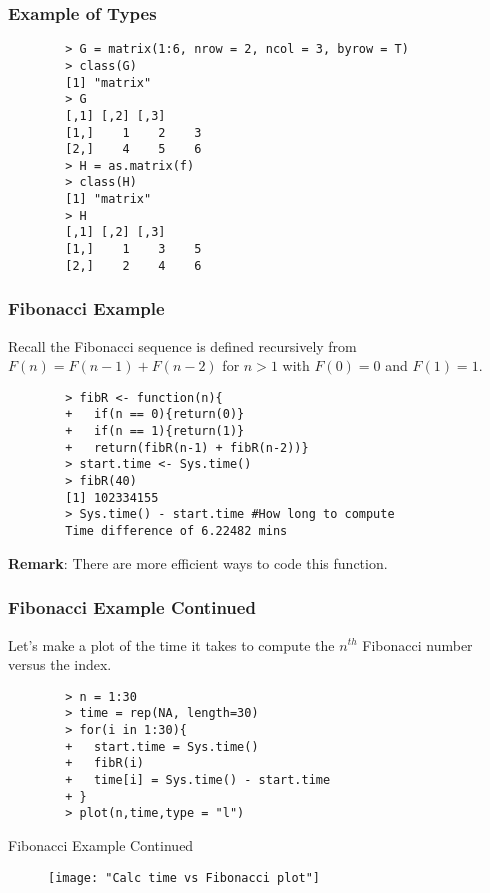 \documentclass{beamer}
\begin{document}
\begin{frame}[fragile]\frametitle{Example of Types}
	\begin{framed}
		\vspace{-0.5cm}
		\begin{verbatim}
		> G = matrix(1:6, nrow = 2, ncol = 3, byrow = T)
		> class(G)
		[1] "matrix"
		> G
		[,1] [,2] [,3]
		[1,]    1    2    3
		[2,]    4    5    6
		> H = as.matrix(f)
		> class(H)
		[1] "matrix"
		> H
		[,1] [,2] [,3]
		[1,]    1    3    5
		[2,]    2    4    6
		\end{verbatim}
	\end{framed}
\end{frame}

\begin{frame}[fragile]\frametitle{Fibonacci Example}
	Recall the Fibonacci sequence is defined recursively from $F(n)=F(n-1)+F(n-2)$ for $n>1$ with $F(0)=0$ and $F(1)=1$.
	\begin{framed}
		\begin{verbatim}
		> fibR <- function(n){
		+   if(n == 0){return(0)}
		+   if(n == 1){return(1)}
		+   return(fibR(n-1) + fibR(n-2))}
		> start.time <- Sys.time()
		> fibR(40)
		[1] 102334155
		> Sys.time() - start.time #How long to compute
		Time difference of 6.22482 mins 
		\end{verbatim}
	\end{framed}
	
	\textbf{Remark}:  There are more efficient ways to code this function. 
\end{frame}


\begin{frame}[fragile]\frametitle{Fibonacci Example Continued}
	Let's make a plot of the time it takes to compute the $n^{th}$ Fibonacci number versus the index.
	\begin{framed}
		\begin{verbatim}
		> n = 1:30
		> time = rep(NA, length=30)
		> for(i in 1:30){
		+   start.time = Sys.time()
		+   fibR(i)
		+   time[i] = Sys.time() - start.time
		+ }
		> plot(n,time,type = "l")
		\end{verbatim}
	\end{framed}
\end{frame}

\begin{frame}{Fibonacci Example Continued}
	
\begin{figure}
\centering
\texttt{[image: "Calc time vs Fibonacci plot"]}
\label{fig:calc-time-vs-fibonacci-plot}
\end{figure}
		
\end{frame}
\end{document}
